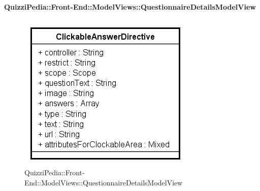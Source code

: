 	\paragraph{QuizziPedia::Front-End::ModelViews::QuestionnaireDetailsModelView}
	
	\label{QuizziPedia::Front-End::ModelViews::QuestionnaireDetailsModelView}
	
	\begin{figure}[ht]
		\centering
		\includegraphics[scale=0.5,keepaspectratio]{UML/Classi/Front-End/QuizziPedia_Front-end_Templates_ClickableAnswerTemplate.png}
		\caption{QuizziPedia::Front-End::ModelViews::QuestionnaireDetailsModelView}
	\end{figure} \FloatBarrier
	
